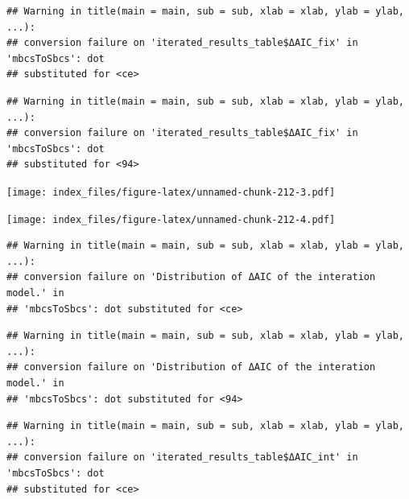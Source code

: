 \documentclass[
]{article}
\newenvironment{Shaded}{\begin{snugshade}}{\end{snugshade}}
\newcommand{\AttributeTok}[1]{\textcolor[rgb]{0.77,0.63,0.00}{#1}}
\newcommand{\FunctionTok}[1]{\textcolor[rgb]{0.00,0.00,0.00}{#1}}
\newcommand{\NormalTok}[1]{#1}
\newcommand{\SpecialCharTok}[1]{\textcolor[rgb]{0.00,0.00,0.00}{#1}}
\newcommand{\StringTok}[1]{\textcolor[rgb]{0.31,0.60,0.02}{#1}}
\begin{document}
\begin{verbatim}
## Warning in title(main = main, sub = sub, xlab = xlab, ylab = ylab, ...):
## conversion failure on 'iterated_results_table$ΔAIC_fix' in 'mbcsToSbcs': dot
## substituted for <ce>
\end{verbatim}

\begin{verbatim}
## Warning in title(main = main, sub = sub, xlab = xlab, ylab = ylab, ...):
## conversion failure on 'iterated_results_table$ΔAIC_fix' in 'mbcsToSbcs': dot
## substituted for <94>
\end{verbatim}

\texttt{[image: index\_files/figure-latex/unnamed-chunk-212-3.pdf]}

\begin{Shaded}
\end{Shaded}

\texttt{[image: index\_files/figure-latex/unnamed-chunk-212-4.pdf]}

\begin{Shaded}
\end{Shaded}

\begin{verbatim}
## Warning in title(main = main, sub = sub, xlab = xlab, ylab = ylab, ...):
## conversion failure on 'Distribution of ΔAIC of the interation model.' in
## 'mbcsToSbcs': dot substituted for <ce>
\end{verbatim}

\begin{verbatim}
## Warning in title(main = main, sub = sub, xlab = xlab, ylab = ylab, ...):
## conversion failure on 'Distribution of ΔAIC of the interation model.' in
## 'mbcsToSbcs': dot substituted for <94>
\end{verbatim}

\begin{verbatim}
## Warning in title(main = main, sub = sub, xlab = xlab, ylab = ylab, ...):
## conversion failure on 'iterated_results_table$ΔAIC_int' in 'mbcsToSbcs': dot
## substituted for <ce>
\end{verbatim}
\end{document}
